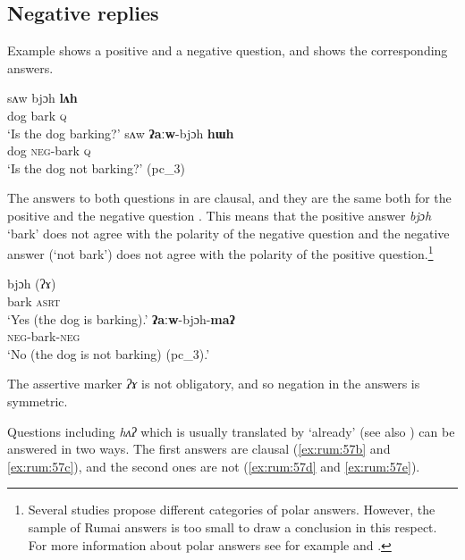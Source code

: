 \documentclass[output=paper,colorlinks,citecolor=brown]{langscibook}
\begin{document}
\subsection{Negative replies} \label{sec:rum:3.1}

Example  shows a positive and a negative question, and  shows the corresponding answers.

\ea\label{ex:rum:55}
    \ea\label{ex:rum:55a}
        \gll sʌw	bjɔh	\textbf{lʌh} \\ 
             dog bark \textsc{q} \\
        \glt ‘Is the dog barking?’
    \ex\label{ex:rum:55b}
        \gll sʌw	\textbf{ʔaːw}-bjɔh	\textbf{hɯh} \\
             dog \textsc{neg}{}-bark \textsc{q} \\
        \glt ‘Is the dog not barking?’ (pc\_3)
    \z
\z 

The answers to both questions in  are clausal, and they are the same both for the positive and the negative question . This means that the positive answer \textit{bjɔh} ‘bark’ does not agree with the polarity of the negative question and the negative answer (‘not bark’) does not agree with the polarity of the positive question.\footnote{Several studies propose different categories of polar answers. However, the sample of Rumai answers is too small to draw a conclusion in this respect. For more information about polar answers see for example \citet{Moser2018} and \citet{EnfieldEtAl2019}.}

\ea\label{ex:rum:56}
    \ea\label{ex:rum:56a}
        \gll bjɔh	(ʔɤ) \\ 
             bark \textsc{asrt} \\
        \glt ‘Yes (the dog is barking).'
    \ex\label{ex:rum:56b}
        \gll \textbf{ʔaːw}-bjɔh-\textbf{maʔ} \\
             \textsc{neg}{}-bark-\textsc{neg} \\
        \glt ‘No (the dog is not barking) (pc\_3).'
    \z
\z 

The assertive marker \textit{ʔɤ} is not obligatory, and so negation in the answers is symmetric.

Questions including \textit{hʌʔ}  which is usually translated by ‘already’ (see also ) can be answered in two ways. The first answers are clausal (\ref{ex:rum:57b} and \ref{ex:rum:57c}), and the second ones are not (\ref{ex:rum:57d} and \ref{ex:rum:57e}). 
\end{document}
